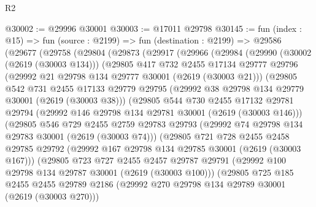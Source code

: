 \begin{lexlean}{R2}
\begin{coremodule}
@30002 := @29996 @30001
@30003 := @17011 @29798
@30145 := fun (index : @15) =>
  fun (source : @2199) =>
  fun (destination : @2199) =>
  @29586
    (@29677
      (@29758
        (@29804
          (@29873
            (@29917
              (@29966
                (@29984
                  (@29990
                    (@30002 (@2619 (@30003 @134)))
                    (@29805
                      @417
                      @732
                      @2455
                      @17134
                      @29777
                      @29796
                      (@29992 @21 @29798 @134 @29777 @30001 (@2619 (@30003 @21)))
                      (@29805
                        @542
                        @731
                        @2455
                        @17133
                        @29779
                        @29795
                        (@29992 @38 @29798 @134 @29779 @30001 (@2619 (@30003 @38)))
                        (@29805
                          @544
                          @730
                          @2455
                          @17132
                          @29781
                          @29794
                          (@29992 @146 @29798 @134 @29781 @30001 (@2619 (@30003 @146)))
                          (@29805
                            @546
                            @729
                            @2455
                            @2759
                            @29783
                            @29793
                            (@29992 @74 @29798 @134 @29783 @30001 (@2619 (@30003 @74)))
                            (@29805
                              @721
                              @728
                              @2455
                              @2458
                              @29785
                              @29792
                              (@29992 @167 @29798 @134 @29785 @30001 (@2619 (@30003 @167)))
                              (@29805
                                @723
                                @727
                                @2455
                                @2457
                                @29787
                                @29791
                                (@29992 @100 @29798 @134 @29787 @30001 (@2619 (@30003 @100)))
                                (@29805
                                  @725
                                  @185
                                  @2455
                                  @2455
                                  @29789
                                  @2186
                                  (@29992 @270 @29798 @134 @29789 @30001 (@2619 (@30003 @270)))

\end{coremodule}
\end{lexlean}
